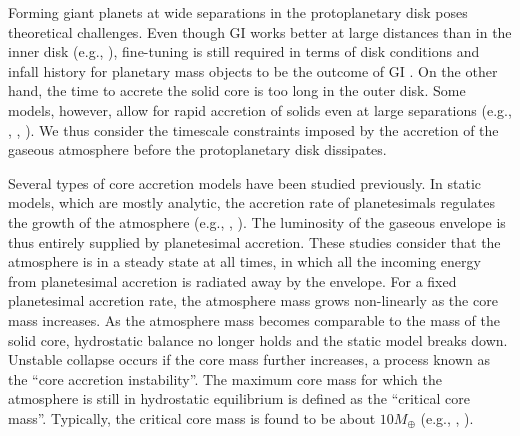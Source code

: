 \documentclass[apj, numberedappendix]{emulateapj}
\begin{document}
Forming giant planets at wide separations in the protoplanetary disk poses theoretical challenges. Even though GI works better at large distances than in the inner disk (e.g., \citealt{rafikov05}), fine-tuning is still required in terms of disk conditions and infall history for planetary mass objects to be the outcome of GI \citep{kratter10}. On the other hand, the time to accrete the solid core is too long in the outer disk. Some models, however, allow for rapid accretion of solids even at large separations (e.g., \citealt{dones93}, \citealt{kenyon09}, \citealt{lambrechts12}). We thus consider the timescale constraints imposed by the accretion of the gaseous atmosphere before the protoplanetary disk dissipates.


Several types of core accretion models have been studied previously. In static models, which are mostly analytic, the accretion rate of planetesimals regulates the growth of the atmosphere  (e.g., \citealt{stevenson82}, \citealt{rafikov06}). The luminosity of the gaseous envelope is thus entirely supplied by planetesimal accretion. These studies consider that the atmosphere is in a steady state at all times, in which all the incoming energy from planetesimal accretion is radiated away by the envelope. For a fixed planetesimal accretion rate, the atmosphere mass grows non-linearly as the core mass increases. As the atmosphere mass becomes comparable to the mass of the solid core, hydrostatic balance no longer holds and the static model breaks down. Unstable collapse occurs if the core mass further increases, a process known as the ``core accretion instability''. The maximum core mass for which the atmosphere is still in hydrostatic equilibrium is defined as the ``critical core mass''.  Typically, the critical core mass is found to be about $10 M_{\oplus}$ (e.g., \citealt{stevenson82}, \citealt{rafikov06}). 

\end{document}
